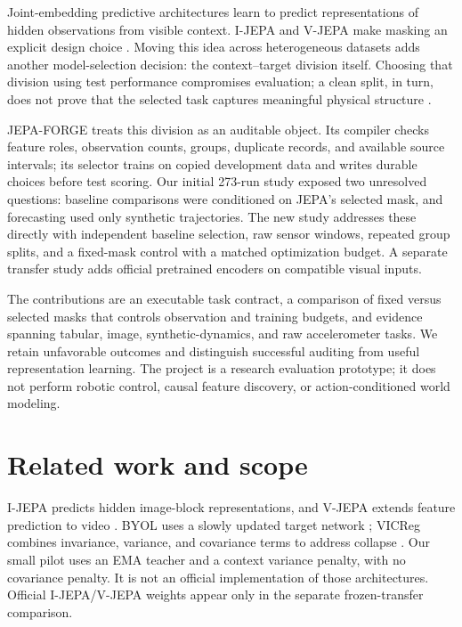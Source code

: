 \documentclass{article}
\newcommand{\jepa}{JEPA-FORGE}
\begin{document}
Joint-embedding predictive architectures learn to predict representations of hidden observations from visible context. I-JEPA and V-JEPA make masking an explicit design choice \citep{assran2023ijepa,bardes2024vjepa}. Moving this idea across heterogeneous datasets adds another model-selection decision: the context--target division itself. Choosing that division using test performance compromises evaluation; a clean split, in turn, does not prove that the selected task captures meaningful physical structure \citep{kapoor2023leakage}.

\jepa{} treats this division as an auditable object. Its compiler checks feature roles, observation counts, groups, duplicate records, and available source intervals; its selector trains on copied development data and writes durable choices before test scoring. Our initial 273-run study exposed two unresolved questions: baseline comparisons were conditioned on JEPA's selected mask, and forecasting used only synthetic trajectories. The new study addresses these directly with independent baseline selection, raw sensor windows, repeated group splits, and a fixed-mask control with a matched optimization budget. A separate transfer study adds official pretrained encoders on compatible visual inputs.

The contributions are an executable task contract, a comparison of fixed versus selected masks that controls observation and training budgets, and evidence spanning tabular, image, synthetic-dynamics, and raw accelerometer tasks. We retain unfavorable outcomes and distinguish successful auditing from useful representation learning. The project is a research evaluation prototype; it does not perform robotic control, causal feature discovery, or action-conditioned world modeling.

\section{Related work and scope}
I-JEPA predicts hidden image-block representations, and V-JEPA extends feature prediction to video \citep{assran2023ijepa,bardes2024vjepa}. BYOL uses a slowly updated target network \citep{grill2020byol}; VICReg combines invariance, variance, and covariance terms to address collapse \citep{bardes2022vicreg}. Our small pilot uses an EMA teacher and a context variance penalty, with no covariance penalty. It is not an official implementation of those architectures. Official I-JEPA/V-JEPA weights appear only in the separate frozen-transfer comparison.
\end{document}
